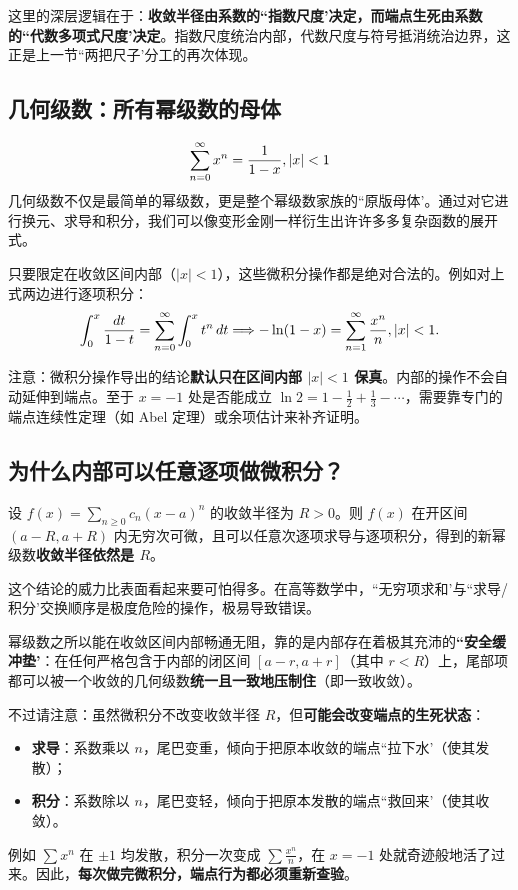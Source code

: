 这里的深层逻辑在于：\textbf{收敛半径由系数的``指数尺度'决定，而端点生死由系数的``代数多项式尺度'决定}。指数尺度统治内部，代数尺度与符号抵消统治边界，这正是上一节``两把尺子'分工的再次体现。

\subsection{几何级数：所有幂级数的母体}

\[
\sum_{n=0}^{\infty}x^n=\frac1{1-x},\space\left|x\right|<1
\]
几何级数不仅是最简单的幂级数，更是整个幂级数家族的``原版母体'。通过对它进行换元、求导和积分，我们可以像变形金刚一样衍生出许许多多复杂函数的展开式。

只要限定在收敛区间内部（\(|x| < 1\)），这些微积分操作都是绝对合法的。例如对上式两边进行逐项积分：
\[
\int_0^x\frac{dt}{1-t}=\sum_{n=0}^{\infty}\int_0^x t^n\,dt
\space\Longrightarrow\space
-\ln(1-x)=\sum_{n=1}^{\infty}\frac{x^n}{n},\space\left|x\right|<1.
\]

注意：微积分操作导出的结论\textbf{默认只在区间内部 \(|x| < 1\) 保真}。内部的操作不会自动延伸到端点。至于 \(x=-1\) 处是否能成立 \(\ln 2=1-\frac12+\frac13-\cdots\)，需要靠专门的端点连续性定理（如 Abel 定理）或余项估计来补齐证明。

\subsection{为什么内部可以任意逐项做微积分？}

\begin{theorem}
设 \(f(x)=\sum_{n\ge0}c_n(x-a)^n\) 的收敛半径为 \(R>0\)。则 \(f(x)\) 在开区间 \((a-R,a+R)\) 内无穷次可微，且可以任意次逐项求导与逐项积分，得到的新幂级数\textbf{收敛半径依然是 \(R\)}。
\end{theorem}

这个结论的威力比表面看起来要可怕得多。在高等数学中，``无穷项求和'与``求导/积分'交换顺序是极度危险的操作，极易导致错误。

幂级数之所以能在收敛区间内部畅通无阻，靠的是内部存在着极其充沛的\textbf{``安全缓冲垫'}：在任何严格包含于内部的闭区间 \([a-r, a+r]\)（其中 \(r < R\)）上，尾部项都可以被一个收敛的几何级数\textbf{统一且一致地压制住}（即一致收敛）。

不过请注意：虽然微积分不改变收敛半径 \(R\)，但\textbf{可能会改变端点的生死状态}：
\begin{itemize}
    \item \textbf{求导}：系数乘以 \(n\)，尾巴变重，倾向于把原本收敛的端点``拉下水'（使其发散）；
    \item \textbf{积分}：系数除以 \(n\)，尾巴变轻，倾向于把原本发散的端点``救回来'（使其收敛）。
\end{itemize}
例如 \(\sum x^n\) 在 \(\pm 1\) 均发散，积分一次变成 \(\sum \frac{x^n}{n}\)，在 \(x=-1\) 处就奇迹般地活了过来。因此，\textbf{每次做完微积分，端点行为都必须重新查验}。

